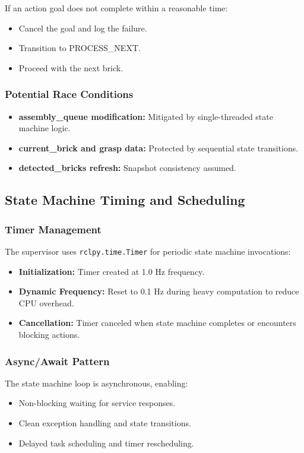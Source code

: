 If an action goal does not complete within a reasonable time:
\begin{itemize}
    \item Cancel the goal and log the failure.
    \item Transition to PROCESS\_NEXT.
    \item Proceed with the next brick.
\end{itemize}

\subsubsection{Potential Race Conditions}

\begin{itemize}
    \item \textbf{assembly\_queue modification:} Mitigated by single-threaded state machine logic.
    \item \textbf{current\_brick and grasp data:} Protected by sequential state transitions.
    \item \textbf{detected\_bricks refresh:} Snapshot consistency assumed.
\end{itemize}

\subsection{State Machine Timing and Scheduling}

\subsubsection{Timer Management}

The supervisor uses \texttt{rclpy.time.Timer} for periodic state machine invocations:
\begin{itemize}
    \item \textbf{Initialization:} Timer created at 1.0 Hz frequency.
    \item \textbf{Dynamic Frequency:} Reset to 0.1 Hz during heavy computation to reduce CPU overhead.
    \item \textbf{Cancellation:} Timer canceled when state machine completes or encounters blocking actions.
\end{itemize}

\subsubsection{Async/Await Pattern}

The state machine loop is asynchronous, enabling:
\begin{itemize}
    \item Non-blocking waiting for service responses.
    \item Clean exception handling and state transitions.
    \item Delayed task scheduling and timer rescheduling.
\end{itemize}

